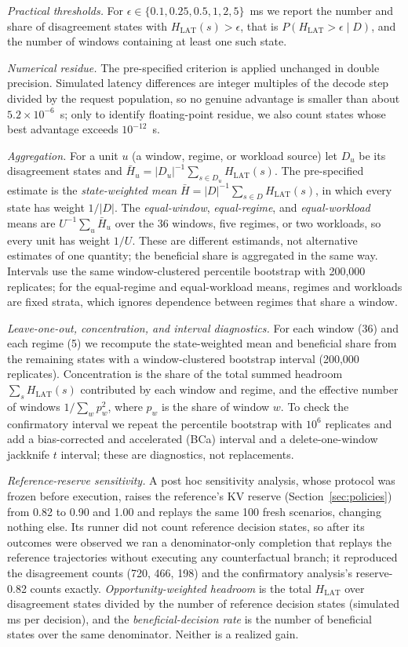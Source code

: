 \documentclass[preprint,12pt]{elsarticle}
\begin{document}
\emph{Practical thresholds.} For $\epsilon\in\{0.1,0.25,0.5,1,2,5\}$~ms we
report the number and share of disagreement states with
$H_{\mathrm{LAT}}(s)>\epsilon$, that is \mbox{$P(H_{\mathrm{LAT}}>\epsilon\mid D)$},
and the number of windows containing at least one such state.

\emph{Numerical residue.} The pre-specified criterion is applied unchanged in
double precision. Simulated latency differences are integer multiples of the
decode step divided by the request population, so no genuine advantage is
smaller than about $5.2\times10^{-6}$~s; only to identify floating-point
residue, we also count states whose best advantage exceeds $10^{-12}$~s.

\emph{Aggregation.} For a unit $u$ (a window, regime, or workload source) let
$D_u$ be its disagreement states and
$\bar H_u=|D_u|^{-1}\sum_{s\in D_u}H_{\mathrm{LAT}}(s)$. The pre-specified
estimate is the \emph{state-weighted mean}
$\bar H=|D|^{-1}\sum_{s\in D}H_{\mathrm{LAT}}(s)$, in which every state has
weight $1/|D|$. The \emph{equal-window}, \emph{equal-regime}, and
\emph{equal-workload} means are $U^{-1}\sum_u\bar H_u$ over the 36 windows, five
regimes, or two workloads, so every unit has weight $1/U$. These are different
estimands, not alternative estimates of one quantity; the beneficial share is
aggregated in the same way. Intervals use the same window-clustered percentile
bootstrap with 200,000 replicates; for the equal-regime and equal-workload
means, regimes and workloads are fixed strata, which ignores dependence between
regimes that share a window.

\emph{Leave-one-out, concentration, and interval diagnostics.} For each window
(36) and each regime (5) we recompute the state-weighted mean and beneficial
share from the remaining states with a window-clustered bootstrap interval
(200,000 replicates). Concentration is the share of the total summed headroom
$\sum_sH_{\mathrm{LAT}}(s)$ contributed by each window and regime, and the
effective number of windows $1/\sum_wp_w^2$, where $p_w$ is the share of window
$w$. To check the confirmatory interval we repeat the percentile bootstrap with
$10^6$ replicates and add a bias-corrected and accelerated (BCa) interval and a
delete-one-window jackknife $t$ interval; these are diagnostics, not
replacements.

\emph{Reference-reserve sensitivity.} A post hoc sensitivity analysis, whose
protocol was frozen before execution, raises the reference's KV reserve
(Section~\ref{sec:policies}) from 0.82 to 0.90 and 1.00 and replays the same 100
fresh scenarios, changing nothing else. Its runner did not count reference
decision states, so after its outcomes were observed we ran a denominator-only
completion that replays the reference trajectories without executing any
counterfactual branch; it reproduced the disagreement counts (720, 466, 198) and
the confirmatory analysis's reserve-0.82 counts exactly. \emph{Opportunity-weighted
headroom} is the total $H_{\mathrm{LAT}}$ over disagreement states divided by the
number of reference decision states (simulated ms per decision), and the
\emph{beneficial-decision rate} is the number of beneficial states over the same
denominator. Neither is a realized gain.
\end{document}
